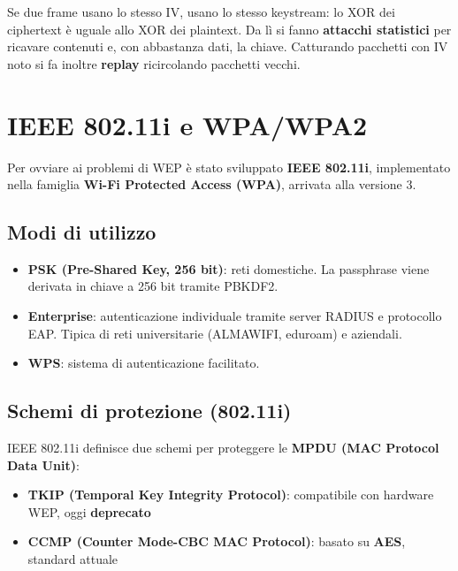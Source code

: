 
Se due frame usano lo stesso IV, usano lo stesso keystream: lo XOR dei ciphertext \`e uguale allo XOR dei plaintext. Da l\`i si fanno \textbf{attacchi statistici} per ricavare contenuti e, con abbastanza dati, la chiave. Catturando pacchetti con IV noto si fa inoltre \textbf{replay} ricircolando pacchetti vecchi.


\section{IEEE 802.11i e WPA/WPA2}

Per ovviare ai problemi di WEP \`e stato sviluppato \textbf{IEEE 802.11i}, implementato nella famiglia \textbf{Wi-Fi Protected Access (WPA)}, arrivata alla versione 3.

\subsection{Modi di utilizzo}

\begin{itemize}
  \item \textbf{PSK (Pre-Shared Key, 256 bit)}: reti domestiche. La passphrase viene derivata in chiave a 256 bit tramite PBKDF2.
  \item \textbf{Enterprise}: autenticazione individuale tramite server RADIUS e protocollo EAP. Tipica di reti universitarie (ALMAWIFI, eduroam) e aziendali.
  \item \textbf{WPS}: sistema di autenticazione facilitato.
\end{itemize}

\subsection{Schemi di protezione (802.11i)}

IEEE 802.11i definisce due schemi per proteggere le \textbf{MPDU (MAC Protocol Data Unit)}:
\begin{itemize}
  \item \textbf{TKIP (Temporal Key Integrity Protocol)}: compatibile con hardware WEP, oggi \textbf{deprecato}
  \item \textbf{CCMP (Counter Mode-CBC MAC Protocol)}: basato su \textbf{AES}, standard attuale
\end{itemize}

